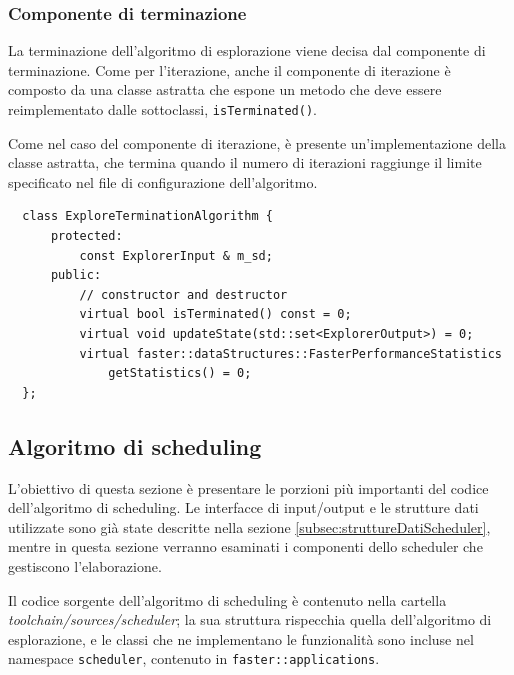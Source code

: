 \subsubsection{Componente di terminazione}
La terminazione dell'algoritmo di esplorazione viene decisa dal componente di 
terminazione. Come per l'iterazione, anche il componente di iterazione è 
composto da una classe astratta che espone un metodo che deve essere 
reimplementato dalle sottoclassi, \verb+isTerminated()+.

Come nel caso del componente di iterazione, è presente un'implementazione della 
classe astratta, che termina quando il numero di iterazioni raggiunge il limite 
specificato nel file di configurazione dell'algoritmo.
\newline
\begin{verbatim}
  class ExploreTerminationAlgorithm {
      protected:
          const ExplorerInput & m_sd;
      public:
          // constructor and destructor
          virtual bool isTerminated() const = 0;
          virtual void updateState(std::set<ExplorerOutput>) = 0;
          virtual faster::dataStructures::FasterPerformanceStatistics 
              getStatistics() = 0;
  };
\end{verbatim}


\subsection{Algoritmo di scheduling}
\label{subsec:algoritmoScheduling}
L'obiettivo di questa sezione è presentare le porzioni più importanti del 
codice dell'algoritmo di scheduling. Le interfacce di input/output e le 
strutture dati utilizzate sono già state descritte nella sezione 
\ref{subsec:struttureDatiScheduler}, mentre in questa sezione verranno esaminati i 
componenti dello scheduler che gestiscono l'elaborazione.

Il codice sorgente dell'algoritmo di scheduling è contenuto nella cartella 
\emph{toolchain/sources/scheduler}; la sua struttura rispecchia quella 
dell'algoritmo di esplorazione, e le classi che ne implementano
le funzionalit\`a sono incluse nel namespace \verb+scheduler+,
contenuto in \verb+faster::applications+.

